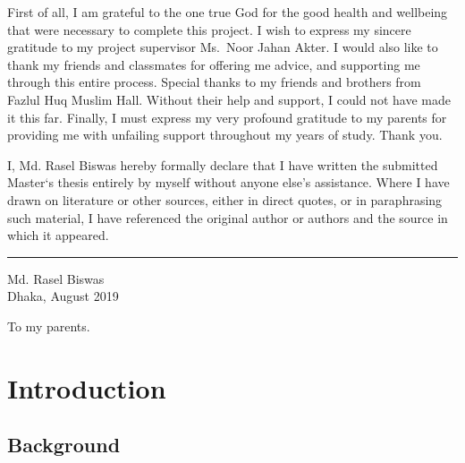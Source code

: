 \documentclass[12pt,oneside,a4paper]{reedthesis}
\begin{document}
  \listoffigures
  \begin{acknowledgements}
    First of all, I am grateful to the one true God for the good health and wellbeing that were necessary to complete this project. I wish to express my sincere gratitude to my project supervisor Ms.~Noor Jahan Akter. I would also like to thank my friends and classmates for offering me advice, and supporting me through this entire process. Special thanks to my friends and brothers from Fazlul Huq Muslim Hall. Without their help and support, I could not have made it this far. Finally, I must express my very profound gratitude to my parents for providing me with unfailing support throughout my years of study. Thank you.
  \end{acknowledgements}
  \begin{declaration}
    I, Md. Rasel Biswas hereby formally declare that I have written the submitted Master`s thesis entirely by myself without anyone else's assistance. Where I have drawn on literature or other sources, either in direct quotes, or in paraphrasing such material, I have referenced the original author or authors and the source in which it appeared.
    \hfill\break
    \hfill\break
    \hfill\break
    \begin{flushleft}
    \rule{0.3\textwidth}{0.4pt}
    \end{flushleft}
    \begin{flushleft}
      Md. Rasel Biswas\\
      Dhaka, August 2019
    \end{flushleft}
  \end{declaration}
  \begin{dedication}
    To my parents.
  \end{dedication}
\mainmatter %
\pagestyle{fancyplain} %

\hypertarget{intro}{%
\chapter{Introduction}\label{intro}}

\hypertarget{background}{%
\section{Background}\label{background}}
\end{document}
